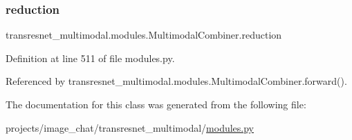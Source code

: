 \subsubsection{\texorpdfstring{reduction}{reduction}}
{\footnotesize\ttfamily transresnet\+\_\+multimodal.\+modules.\+Multimodal\+Combiner.\+reduction}



Definition at line 511 of file modules.\+py.



Referenced by transresnet\+\_\+multimodal.\+modules.\+Multimodal\+Combiner.\+forward().



The documentation for this class was generated from the following file\+:\begin{DoxyCompactItemize}
\item 
projects/image\+\_\+chat/transresnet\+\_\+multimodal/\hyperlink{projects_2image__chat_2transresnet__multimodal_2modules_8py}{modules.\+py}\end{DoxyCompactItemize}
